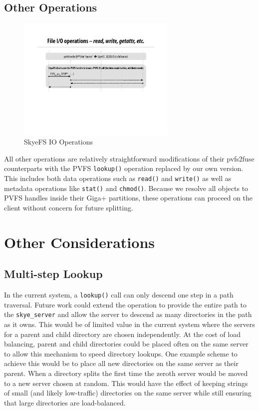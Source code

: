 \documentclass[twocolumn,letterpaper]{article}
\newcommand{\code}[1]{\texttt{#1}}
\begin{document}
\subsection{Other Operations}
\begin{figure}
\begin{center}
\includegraphics[width=3in]{figure-other}
\end{center}
\caption{SkyeFS IO Operations}
\end{figure}
All other operations are relatively straightforward modifications of their
pvfs2\-fuse counterparts with the PVFS \code{lookup()} operation replaced by
our own version.  This includes both data operations such as \code{read()} and
\code{write()} as well as metadata operations like \code{stat()} and
\code{chmod()}.  Because we resolve all objects to PVFS handles inside their
Giga+ partitions, these operations can proceed on the client without concern
for future splitting.

\section{Other Considerations}
\subsection{Multi-step Lookup}
In the current system, a \code{lookup()} call can only descend one step in a path
traversal.  Future work could extend the operation to provide the entire path
to the \code{skye\_\-server} and allow the server to descend as many
directories in the path as it owns.  This would be of limited value in the
current system where the servers for a parent and child directory are chosen
independently.  At the cost of load balancing, parent and child directories
could be placed often on the same server to allow this mechanism to speed
directory lookups.  One example scheme to achieve this would be to place all
new directories on the same server as their parent.  When a directory splits
the first time the zeroth server would be moved to a new server chosen at
random.  This would have the effect of keeping strings of small (and likely
low-traffic) directories on the same server while still ensuring that large
directories are load-balanced.
\end{document}
